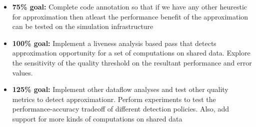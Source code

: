 \documentclass[12pt,conference]{IEEEtran}
\begin{document}
\begin{itemize}

\item \textbf{75\% goal:} Complete code annotation so that if we have any other heurestic
 for approximation then atleast the  performance benefit of the approximation can be tested on the simulation infrastructure
\item \textbf{100\% goal:} Implement a liveness analysis based pass that detects approximation opportunity for a set of computations on shared data. Explore the sensitivity of the quality threshold on the resultant performance and error values.
\item \textbf{125\% goal:} Implement other dataflow analyses and test other quality metrics to detect approximationr. Perform experiments to test the performance-accuracy tradeoff of different detection policies. Also, add support for more kinds of computations on shared data

\end{itemize}





%
%

\end{document}

